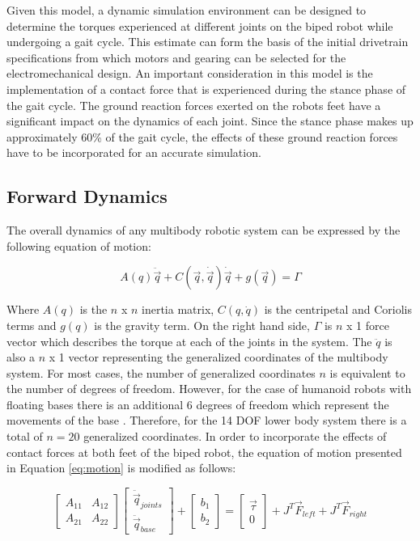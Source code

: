 Given this model, a dynamic simulation environment can be designed to determine the torques experienced at different joints on the biped robot while undergoing a gait cycle. This estimate can form the basis of the initial drivetrain specifications from which motors and gearing can be selected for the electromechanical design. An important consideration in this model is the implementation of a contact force that is experienced during the stance phase of the gait cycle. The ground reaction forces exerted on the robots feet have a significant impact on the dynamics of each joint. Since the stance phase makes up approximately 60\% of the gait cycle, the effects of these ground reaction forces have to be incorporated for an accurate simulation. 

\subsection{Forward Dynamics} %
\label{sec:forward_dynamics}

The overall dynamics of any multibody robotic system can be expressed by the following equation of motion: 

\begin{equation}
	\label{eq:motion}
	A(q)\ddot{\vec{q}} + C(\vec{q},\dot{\vec{q}})\dot{\vec{q}} + g(\vec{q}) = \Gamma
\end{equation}

Where $A(q)$ is the $n$ x $n$ inertia matrix, $C(q,\dot{q})$ is the centripetal and Coriolis terms and $g(q)$ is the gravity term. On the right hand side, $\Gamma$ is $n$ x 1 force vector which describes the torque at each of the joints in the system. The $\ddot{q}$ is also a $n$ x 1 vector representing the generalized coordinates of the multibody system. For most cases, the number of generalized coordinates $n$ is equivalent to the number of degrees of freedom. However, for the case of humanoid robots with floating bases there is an additional 6 degrees of freedom which represent the movements of the base \cite{Perrin:1997wn}. Therefore, for the 14 DOF lower body system there is a total of $n = 20$ generalized coordinates. In order to incorporate the effects of contact forces at both feet of the biped robot, the equation of motion presented in Equation \ref{eq:motion} is modified as follows: 


\begin{equation}
	\label{eq:motion2}
	\begin{bmatrix} A_{11} & A_{12} \\ A_{21} & A_{22} \end{bmatrix} 
	\begin{bmatrix} \ddot{\vec{q}}_{joints} \\ \ddot{\vec{q}}_{base} \end{bmatrix} + 
	\begin{bmatrix} b_{1} \\ b_{2} \end{bmatrix} = 
	\begin{bmatrix} \vec{\tau} \\ 0 \end{bmatrix} + 
    J^{T}\vec{F}_{left} + J^{T}\vec{F}_{right}
\end{equation}

